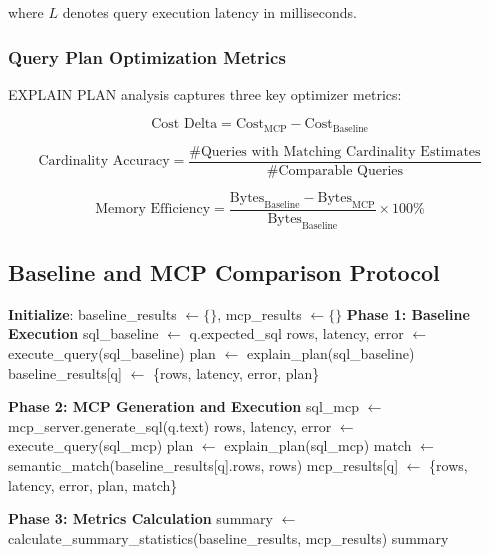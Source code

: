 \documentclass[11pt,a4paper]{article}
\begin{document}
where $L$ denotes query execution latency in milliseconds.

\subsubsection{Query Plan Optimization Metrics}
EXPLAIN PLAN analysis captures three key optimizer metrics:

\begin{equation}
\text{Cost Delta} = \text{Cost}_{\text{MCP}} - \text{Cost}_{\text{Baseline}}
\end{equation}

\begin{equation}
\text{Cardinality Accuracy} = \frac{\text{\# Queries with Matching Cardinality Estimates}}{\text{\# Comparable Queries}}
\end{equation}

\begin{equation}
\text{Memory Efficiency} = \frac{\text{Bytes}_{\text{Baseline}} - \text{Bytes}_{\text{MCP}}}{\text{Bytes}_{\text{Baseline}}} \times 100\%
\end{equation}

\subsection{Baseline and MCP Comparison Protocol}

\begin{algorithm}[h]
\caption{Evaluation Protocol}
\begin{algorithmic}[1]
    \State \textbf{Initialize}: baseline\_results $\leftarrow \{\}$, mcp\_results $\leftarrow \{\}$
    \State \textbf{Phase 1: Baseline Execution}
        \State sql\_baseline $\leftarrow$ q.expected\_sql
        \State rows, latency, error $\leftarrow$ execute\_query(sql\_baseline)
        \State plan $\leftarrow$ explain\_plan(sql\_baseline)
        \State baseline\_results[q] $\leftarrow$ \{rows, latency, error, plan\}
    \EndFor
    
    \State \textbf{Phase 2: MCP Generation and Execution}
        \State sql\_mcp $\leftarrow$ mcp\_server.generate\_sql(q.text)
            \State rows, latency, error $\leftarrow$ execute\_query(sql\_mcp)
            \State plan $\leftarrow$ explain\_plan(sql\_mcp)
            \State match $\leftarrow$ semantic\_match(baseline\_results[q].rows, rows)
            \State mcp\_results[q] $\leftarrow$ \{rows, latency, error, plan, match\}
        \EndIf
    \EndFor
    
    \State \textbf{Phase 3: Metrics Calculation}
    \State summary $\leftarrow$ calculate\_summary\_statistics(baseline\_results, mcp\_results)
    \Return summary
\EndProcedure
\end{algorithmic}
\end{algorithm}
\end{document}
